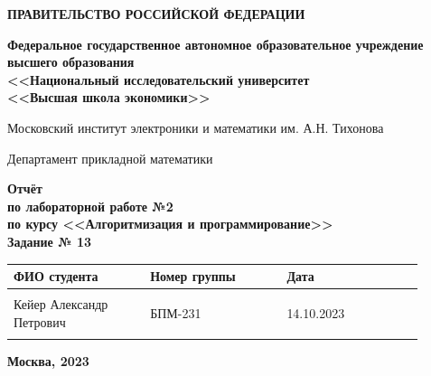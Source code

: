 \documentclass[12pt]{article}
\begin{document}
	
	\thispagestyle{empty}
	\begin{center}
		\textbf{ПРАВИТЕЛЬСТВО РОССИЙСКОЙ ФЕДЕРАЦИИ}
		
		\vspace{5ex}
		
		\textbf{Федеральное государственное автономное образовательное учреждение \\ высшего образования \\ <<Национальный исследовательский университет \\ <<Высшая школа экономики>>}
	\end{center}
	\vspace{5ex}
	
	\begin{center}
		Московский институт электроники и математики им. А.Н. Тихонова  
		
		\vspace{5ex}
		
		Департамент прикладной математики
		
		\vspace{10ex}
		\textbf{Отчёт \\ по лабораторной работе №2 \\ по курсу <<Алгоритмизация и программирование>> \\ Задание № 13}
		\vspace{7ex}
		
	\end{center}
	
	\begin{center} 
		\begin{tabular}{| p{0.3\linewidth}| p{0.3\linewidth}| p{0.3\linewidth}|}
			\hline	
			ФИО студента & Номер группы & Дата \\  \hline
			& & \\  
			Кейер Александр \newline Петрович & БПМ-231 & 14.10.2023\\  
			& & \\  \hline		
		\end{tabular}
	\end{center}
	
	\begin{center}
		\vspace{3ex}
		
		\vfill
		
		\normalsize
		
		\textbf{Москва, 2023}
	\end{center}
	
\end{document}
